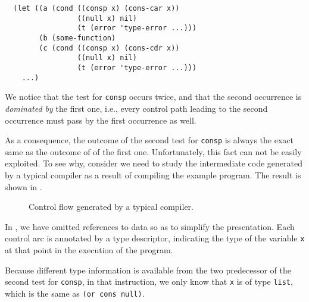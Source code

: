\begin{verbatim}
  (let ((a (cond ((consp x) (cons-car x))
                 ((null x) nil)
                 (t (error 'type-error ...)))
        (b (some-function)
        (c (cond ((consp x) (cons-cdr x))
                 ((null x) nil)
                 (t (error 'type-error ...)))
    ...)
\end{verbatim}

We notice that the test for \texttt{consp} occurs twice, and that the
second occurrence is \emph{dominated by} the first one, i.e., every
control path leading to the second occurrence must pass by the first
occurrence as well.

As a consequence, the outcome of the second test for \texttt{consp} is
always the exact same as the outcome of of the first one.
Unfortunately, this fact can not be easily exploited.  To see why,
consider we need to study the intermediate code generated by a
typical compiler as a result of compiling the example program.  The
result is shown in .

\begin{figure}
\begin{center}
\end{center}
\caption{\label{fig-example-naive}
Control flow generated by a typical compiler.}
\end{figure}

In , we have omitted references to data so
as to simplify the presentation.  Each control arc is annotated by a
type descriptor, indicating the type of the variable \texttt{x} at
that point in the execution of the program.

Because different type information is available from the two
predecessor of the second test for \texttt{consp}, in that
instruction, we only know that \texttt{x} is of type \texttt{list},
which is the same as \texttt{(or cons null)}.
